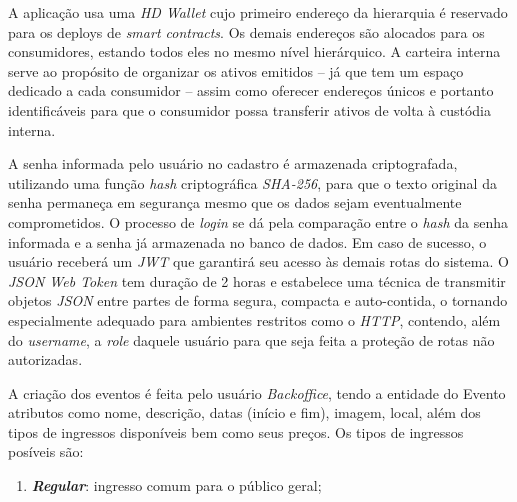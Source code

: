 {%

A aplicação usa uma \textit{HD Wallet} cujo primeiro endereço da hierarquia é reservado para os deploys de \textit{smart contracts}. Os demais endereços são alocados para os consumidores, estando todos eles no mesmo nível hierárquico. A carteira interna serve ao propósito de organizar os ativos emitidos -- já que tem um espaço dedicado a cada consumidor -- assim como oferecer endereços únicos e portanto identificáveis para que o consumidor possa transferir ativos de volta à custódia interna.


A senha informada pelo usuário no cadastro é armazenada criptografada, utilizando uma função \textit{hash} criptográfica \textit{SHA-256}, para que o texto original da senha permaneça em segurança mesmo que os dados sejam eventualmente comprometidos. O processo de \textit{login} se dá pela comparação entre o \textit{hash} da senha informada e a senha já armazenada no banco de dados. Em caso de sucesso, o usuário receberá um \textit{JWT} que garantirá seu acesso às demais rotas do sistema. O \textit{JSON Web Token} tem duração de 2 horas e estabelece uma técnica de transmitir objetos \textit{JSON} entre partes de forma segura, compacta e auto-contida, o tornando especialmente adequado para ambientes restritos como o \textit{HTTP}, contendo, além do \textit{username}, a \textit{role} daquele usuário para que seja feita a proteção de rotas não autorizadas.


A criação dos eventos é feita pelo usuário \textit{Backoffice}, tendo a entidade do Evento atributos como nome, descrição, datas (início e fim), imagem, local, além dos tipos de ingressos disponíveis bem como seus preços. Os tipos de ingressos posíveis são:

\begin{enumerate} 
    \item \textit{\textbf{Regular}}: ingresso comum para o público geral; 
    

\end{enumerate}}
